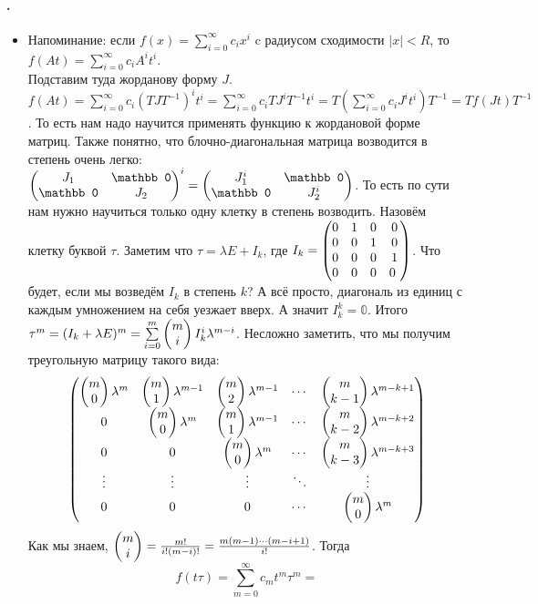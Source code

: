 \documentclass{article}
\begin{document}
    \paragraph{.}
    \begin{itemize}
        \item[]
        \begin{Comment}
            Напоминание: если $f(x)=\sum\limits_{i=0}^\infty c_ix^i$ c радиусом сходимости $|x|<R$, то $f(At)=\sum\limits_{i=0}^\infty c_iA^it^i$.\\
            Подставим туда жорданову форму $J$. $f(At)=\sum\limits_{i=0}^\infty c_i(TJT^{-1})^it^i=\sum\limits_{i=0}^\infty c_iTJ^iT^{-1}t^i=T\left(\sum\limits_{i=0}^\infty c_iJ^it^i\right)T^{-1}=Tf(Jt)T^{-1}$. То есть нам надо научится применять функцию к жордановой форме матриц. Также понятно, что блочно-диагональная матрица возводится в степень очень легко: $\matr{J_1 & \mathbb0\\\mathbb0 & J_2}^i=\matr{J_1^i & \mathbb0\\\mathbb0 & J_2^i}$. То есть по сути нам нужно научиться только одну клетку в степень возводить. Назовём клетку буквой $\tau$. Заметим что $\tau=\lambda E+I_k$, где $I_k=\left(\begin{matrix}
                0 & 1 & 0 & 0\\
                0 & 0 & 1 & 0\\
                0 & 0 & 0 & 1\\
                0 & 0 & 0 & 0\
            \end{matrix}\right)$. Что будет, если мы возведём $I_k$ в степень $k$? А всё просто, диагональ из единиц с каждым умножением на себя уезжает вверх. А значит $I_k^k=\mathbb0$. Итого $\tau^m=(I_k+\lambda E)^m=\sum\limits_{i=0}^m\left(\begin{matrix}m\\i\end{matrix}\right)I_k^i\lambda^{m-i}$. Несложно заметить, что мы получим треугольную матрицу такого вида:
            $$
            \left(\begin{matrix}
                \left(\begin{matrix}m\\0\end{matrix}\right)\lambda^m & \left(\begin{matrix}m\\1\end{matrix}\right)\lambda^{m-1} & \left(\begin{matrix}m\\2\end{matrix}\right)\lambda^{m-1} & \cdots & \left(\begin{matrix}m\\k-1\end{matrix}\right)\lambda^{m-k+1}\\
                0 & \left(\begin{matrix}m\\0\end{matrix}\right)\lambda^m & \left(\begin{matrix}m\\1\end{matrix}\right)\lambda^{m-1} & \cdots & \left(\begin{matrix}m\\k-2\end{matrix}\right)\lambda^{m-k+2}\\
                0 & 0 & \left(\begin{matrix}m\\0\end{matrix}\right)\lambda^m & \cdots & \left(\begin{matrix}m\\k-3\end{matrix}\right)\lambda^{m-k+3}\\
                \vdots & \vdots & \vdots & \ddots & \vdots\\
                0 & 0 & 0 & \cdots & \left(\begin{matrix}m\\0\end{matrix}\right)\lambda^m
            \end{matrix}\right)
            $$
            Как мы знаем, $\left(\begin{matrix}m\\i\end{matrix}\right)=\frac{m!}{i!(m-i)!}=\frac{m(m-1)\cdots(m-i+1)}{i!}$. Тогда
            $$
            f(t\tau)=\sum\limits_{m=0}^\infty c_mt^m\tau^m=
            $$
        \end{Comment}
    \end{itemize}
\end{document}
